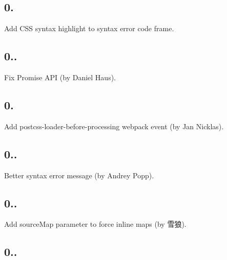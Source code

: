 \subsection*{0.}


\begin{DoxyItemize}
\item Add C\+SS syntax highlight to syntax error code frame.
\end{DoxyItemize}

\subsection*{0..}


\begin{DoxyItemize}
\item Fix Promise A\+PI (by Daniel Haus).
\end{DoxyItemize}

\subsection*{0.}


\begin{DoxyItemize}
\item Add {\ttfamily postcss-\/loader-\/before-\/processing} webpack event (by Jan Nicklas).
\end{DoxyItemize}

\subsection*{0..}


\begin{DoxyItemize}
\item Better syntax error message (by Andrey Popp).
\end{DoxyItemize}

\subsection*{0..}


\begin{DoxyItemize}
\item Add {\ttfamily source\+Map} parameter to force inline maps (by 雪狼).
\end{DoxyItemize}

\subsection*{0..}


